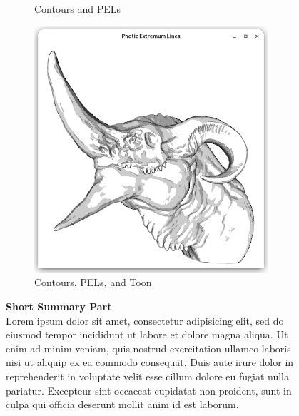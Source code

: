 \documentclass[9pt,fleqn,twoside,twocolumn]{stdglobal}
\begin{document}
\begin{figure}
\begin{subfigure}[b]{0.24\textwidth}
        \caption{Contours and PELs}
      \end{subfigure}%
      \hfill
      \begin{subfigure}[b]{0.24\textwidth}
        \centering
        \includegraphics[width=0.95\textwidth,trim={15px 15 15 50},clip]{images/dragon-head-contour-pel-toon-shader.png}
        \caption{Contours, PELs, and Toon}
      \end{subfigure}%
      \caption{\textbf{Short Summary Part}\\
      Lorem ipsum dolor sit amet, consectetur adipisicing elit, sed do eiusmod
      tempor incididunt ut labore et dolore magna aliqua. Ut enim ad minim veniam,
      quis nostrud exercitation ullamco laboris nisi ut aliquip ex ea commodo
      consequat. Duis aute irure dolor in reprehenderit in voluptate velit esse
      cillum dolore eu fugiat nulla pariatur. Excepteur sint occaecat cupidatat non
      proident, sunt in culpa qui officia deserunt mollit anim id est laborum.}
    \end{figure}
\end{document}
